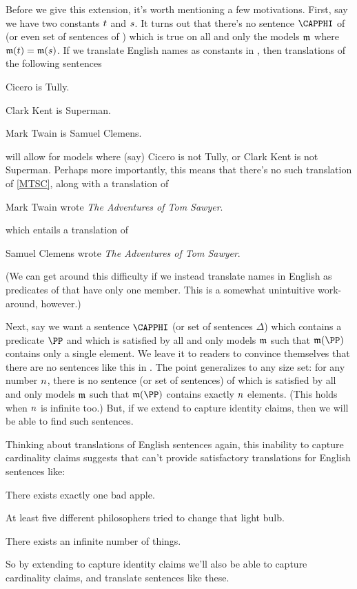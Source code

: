 Before we give this extension, it's worth mentioning a few motivations. 
First, say we have two constants $t$ and $s$. 
It turns out that there's no sentence $\CAPPHI$ of \GQL{} (or even set of sentences of \GQL{}) which is true on all and only the models $\mathfrak{m}$ where $\mathfrak{m}(t)=\mathfrak{m}(s)$. 
If we translate English names as constants in \GQL{}, then translations of the following sentences
\begin{menumerate}
\item\label{CiceroTully} Cicero is Tully.
\item\label{Superman} Clark Kent is Superman.
\item\label{MTSC} Mark Twain is Samuel Clemens.
\end{menumerate} 
will allow for models where (say) Cicero is not Tully, or Clark Kent is not Superman.
Perhaps more importantly, this means that there's no such translation of \ref{MTSC}, along with a translation of 
\begin{menumerate}
\item Mark Twain wrote \emph{The Adventures of Tom Sawyer}.
\end{menumerate}
which entails a translation of 
\begin{menumerate}
\item Samuel Clemens wrote \emph{The Adventures of Tom Sawyer}.
\end{menumerate}
(We can get around this difficulty if we instead translate names in English as predicates of \GQL{} that have only one member.  This is a somewhat unintuitive work-around, however.)

Next, say we want a sentence $\CAPPHI$ (or set of sentences $\Delta$) which contains a predicate $\PP$ and which is satisfied by all and only models $\mathfrak{m}$ such that $\IntA(\PP)$ contains only a single element. 
We leave it to readers to convince themselves that there are no sentences like this in \GQL{}.
The point generalizes to any size set: for any number $n$, there is no sentence (or set of sentences) of \GQL{} which is satisfied by all and only models $\mathfrak{m}$ such that $\IntA(\PP)$ contains exactly $n$ elements. 
(This holds when $n$ is infinite too.)
But, if we extend \GQL{} to capture identity claims, then we will be able to find such sentences. 

Thinking about translations of English sentences again, this inability to capture cardinality claims suggests that \GQL{} can't provide satisfactory translations for English sentences like:
\begin{menumerate}
\item There exists exactly one bad apple. 
\item At least five different philosophers tried to change that light bulb.
\item There exists an infinite number of things. 
\end{menumerate}
So by extending \GQL{} to capture identity claims we'll also be able to capture cardinality claims, and translate sentences like these. 

